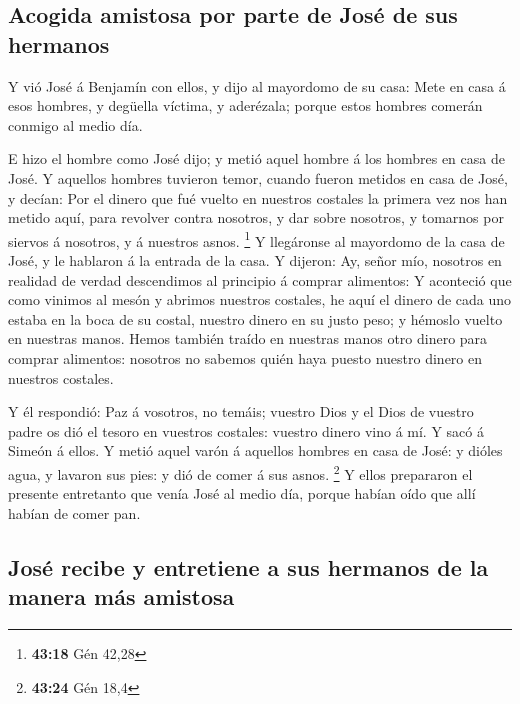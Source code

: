 \hypertarget{acogida-amistosa-por-parte-de-josuxe9-de-sus-hermanos}{%
\subsection{Acogida amistosa por parte de José de sus
hermanos}\label{acogida-amistosa-por-parte-de-josuxe9-de-sus-hermanos}}

 Y vió José á Benjamín con ellos, y dijo al mayordomo de su
casa: Mete en casa á esos hombres, y degüella víctima, y aderézala;
porque estos hombres comerán conmigo al medio día.

 E hizo el hombre como José dijo; y metió aquel hombre á
los hombres en casa de José.  Y aquellos hombres tuvieron
temor, cuando fueron metidos en casa de José, y decían: Por el dinero
que fué vuelto en nuestros costales la primera vez nos han metido aquí,
para revolver contra nosotros, y dar sobre nosotros, y tomarnos por
siervos á nosotros, y á nuestros asnos. \footnote{\textbf{43:18} Gén
  42,28}  Y llegáronse al mayordomo de la casa de José, y
le hablaron á la entrada de la casa.  Y dijeron: Ay, señor
mío, nosotros en realidad de verdad descendimos al principio á comprar
alimentos:  Y aconteció que como vinimos al mesón y abrimos
nuestros costales, he aquí el dinero de cada uno estaba en la boca de su
costal, nuestro dinero en su justo peso; y hémoslo vuelto en nuestras
manos.  Hemos también traído en nuestras manos otro dinero
para comprar alimentos: nosotros no sabemos quién haya puesto nuestro
dinero en nuestros costales.

 Y él respondió: Paz á vosotros, no temáis; vuestro Dios y
el Dios de vuestro padre os dió el tesoro en vuestros costales: vuestro
dinero vino á mí. Y sacó á Simeón á ellos.  Y metió aquel
varón á aquellos hombres en casa de José: y dióles agua, y lavaron sus
pies: y dió de comer á sus asnos. \footnote{\textbf{43:24} Gén 18,4}
 Y ellos prepararon el presente entretanto que venía José
al medio día, porque habían oído que allí habían de comer pan.

\hypertarget{josuxe9-recibe-y-entretiene-a-sus-hermanos-de-la-manera-muxe1s-amistosa}{%
\subsection{José recibe y entretiene a sus hermanos de la manera más
amistosa}\label{josuxe9-recibe-y-entretiene-a-sus-hermanos-de-la-manera-muxe1s-amistosa}}

